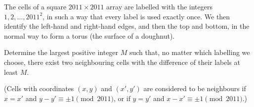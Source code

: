 The cells of a square $2011 \times 2011$ array are labelled with the integers $1,2,\ldots, 2011^2$, in such a way that every label is used exactly once. We then identify the left-hand and right-hand edges, and then the top and bottom, in the normal way to form a torus (the surface of a doughnut).

Determine the largest positive integer $M$ such that, no matter which labelling we choose, there exist two neighbouring cells with the difference of their labels at least $M$.

(Cells with coordinates $(x,y)$ and $(x',y')$ are considered to be neighbours if $x=x'$ and $y-y'\equiv\pm1\pmod{2011}$, or if $y=y'$ and $x-x'\equiv\pm1\pmod{2011}$.)